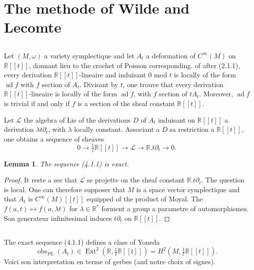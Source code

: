 \documentclass[11pt,a4paper]{article}
\theoremstyle{plain}
\newtheorem{lemma}[theorem]{Lemma}
\theoremstyle{definition}
\DeclareMathOperator{\Ext}{Ext}
\DeclareMathOperator{\ad}{ad}
\DeclareMathOperator{\obs}{obs}
\newcommand{\R}{\mathbb{R}}
\begin{document}
\section{The methode of Wilde and Lecomte}

\subsection{}
Let $(M,\omega)$ a variety symplectique and let $A_{t}$ a deformation of $C^{\infty}(M)$
on $\R[[t]]$, donnant lieu to the crochet of Poisson corresponding. of after (2.1.1), every
derivation $\R[[t]]$-lineaire and induisant $0$ mod $t$ is locally of the form $\ad f$ with
$f$ section of $A_{t}$. Divisant by $t$, one trouve that every derivation $\R[[t]]$-lineaire is
locally of the form $\ad f$, with $f$ section of $tA_{t}$. Moreover, $\ad f$ is trivial if and only if $f$ is a section of the sheaf constant $\R[[t]]$.

Let $\mathcal{L}$ the algebra of Lie of the derivations $D$ of $A_{t}$ induisant on $\R[[t]]$ a derivation $\lambda t\partial_{t}$, with $\lambda$ locally constant. Associant a $D$ sa restriction a $\R[[t]]$, one obtains a sequence of sheaves
\begin{equation}
0 \longrightarrow \tfrac{1}{t}\R[[t]] \longrightarrow \mathcal{L} \longrightarrow \R.t\partial_{t} \longrightarrow 0. \tag{4.1.1}
\end{equation}

\begin{lemma}
The sequence (4.1.1) is exact.
\end{lemma}

\begin{proof}
It reste a see that $\mathcal{L}$ se projette on the sheaf constant $\R.t\partial_{t}$. The question
is local. One can therefore supposer that $M$ is a space vector symplectique and
that $A_{t}$ is $C^{\infty}(M)[[t]]$ equipped of the product of Moyal. The $f(a,t) \mapsto f(a, \lambda t)$ for $\lambda \in \R^{*}$ forment a group a parametre of automorphismes. Son generateur infinitesimal
induces $t\partial_{t}$ on $\R[[t]]$.
\end{proof}

\subsection{}
The exact sequence (4.1.1) defines a class of Yoneda
\[
\obs_{PL}(A_{t}) \in \Ext^{2}(\R, \tfrac{1}{t}\R[[t]]) = H^{2}(M, \tfrac{1}{t}\R[[t]]).
\]
Voici son interpretation en terme of gerbes (and notre choix of signes).
\end{document}
